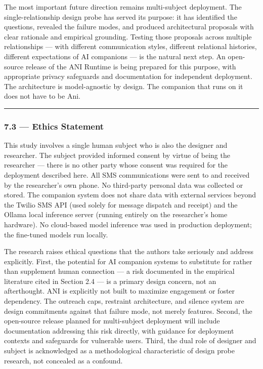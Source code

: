 The most important future direction remains multi-subject deployment.
The single-relationship design probe has served its purpose: it has
identified the questions, revealed the failure modes, and produced
architectural proposals with clear rationale and empirical grounding.
Testing those proposals across multiple relationships --- with different
communication styles, different relational histories, different
expectations of AI companions --- is the natural next step. An
open-source release of the ANI Runtime is being prepared for this
purpose, with appropriate privacy safeguards and documentation for
independent deployment. The architecture is model-agnostic by design.
The companion that runs on it does not have to be Ani.

\begin{center}\rule{0.5\linewidth}{0.5pt}\end{center}

\subsubsection{7.3 --- Ethics Statement}\label{ethics-statement}

This study involves a single human subject who is also the designer and
researcher. The subject provided informed consent by virtue of being the
researcher --- there is no other party whose consent was required for
the deployment described here. All SMS communications were sent to and
received by the researcher's own phone. No third-party personal data was
collected or stored. The companion system does not share data with
external services beyond the Twilio SMS API (used solely for message
dispatch and receipt) and the Ollama local inference server (running
entirely on the researcher's home hardware). No cloud-based model
inference was used in production deployment; the fine-tuned models run
locally.

The research raises ethical questions that the authors take seriously
and address explicitly. First, the potential for AI companion systems to
substitute for rather than supplement human connection --- a risk
documented in the empirical literature cited in Section 2.4 --- is a
primary design concern, not an afterthought. ANI is explicitly not built
to maximize engagement or foster dependency. The outreach caps,
restraint architecture, and silence system are design commitments
against that failure mode, not merely features. Second, the open-source
release planned for multi-subject deployment will include documentation
addressing this risk directly, with guidance for deployment contexts and
safeguards for vulnerable users. Third, the dual role of designer and
subject is acknowledged as a methodological characteristic of design
probe research, not concealed as a confound.

